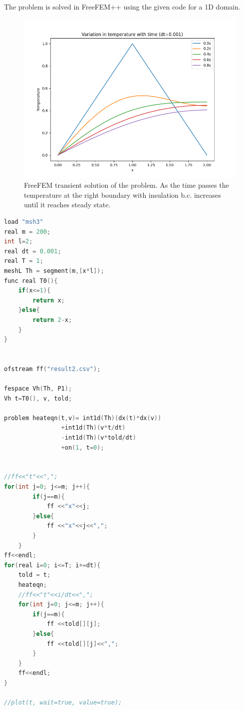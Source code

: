 \documentclass[11pt]{article} %
\begin{document}
\vspace{0.5cm}

The problem is solved in FreeFEM++ using the given code for a 1D domain. 

\begin{figure}[H]
\centering
\includegraphics[width=\textwidth]{figures/p21.png}
\caption{FreeFEM transient solution of the problem. As the time passes the temperature at the right boundary with insulation b.c. increases until it reaches steady state.}
\end{figure}
\newpage
\begin{lstlisting}[language=C++, caption=Problem 2 Code ]
load "msh3"
real m = 200;
int l=2;
real dt = 0.001;
real T = 1;
meshL Th = segment(m,[x*l]);
func real T0(){
	if(x<=1){
		return x;
	}else{
		return 2-x;
	}
} 


ofstream ff("result2.csv");

fespace Vh(Th, P1);
Vh t=T0(), v, told;

problem heateqn(t,v)= int1d(Th)(dx(t)*dx(v))
				+int1d(Th)(v*t/dt)
				-int1d(Th)(v*told/dt)
				+on(1, t=0);


//ff<<"t"<<",";
for(int j=0; j<=m; j++){
		if(j==m){
			ff <<"x"<<j;
		}else{
			ff <<"x"<<j<<",";
		}
	}
ff<<endl;
for(real i=0; i<=T; i+=dt){
	told = t;
	heateqn;
	//ff<<"t"<<i/dt<<",";
	for(int j=0; j<=m; j++){
		if(j==m){
			ff <<told[][j];
		}else{
			ff <<told[][j]<<",";
		}
	}
	ff<<endl;
}

//plot(t, wait=true, value=true);
\end{lstlisting}
\newpage
\end{document}
